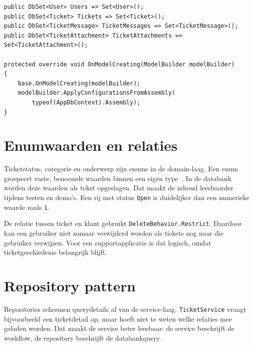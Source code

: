 \begin{listing}[htbp]
\begin{verbatim}
public DbSet<User> Users => Set<User>();
public DbSet<Ticket> Tickets => Set<Ticket>();
public DbSet<TicketMessage> TicketMessages => Set<TicketMessage>();
public DbSet<TicketAttachment> TicketAttachments => Set<TicketAttachment>();

protected override void OnModelCreating(ModelBuilder modelBuilder)
{
    base.OnModelCreating(modelBuilder);
    modelBuilder.ApplyConfigurationsFromAssembly(
        typeof(AppDbContext).Assembly);
}
\end{verbatim}
\caption[DbContext met configuraties]{\texttt{AppDbContext} laadt configuraties uit de persistence-laag.}
\label{lst:appdbcontext}
\end{listing}

\section{Enumwaarden en relaties}

Ticketstatus, categorie en onderwerp zijn enums in de domain-laag. Een enum groepeert vaste, benoemde waarden binnen een eigen type~\autocite{MicrosoftCSharpEnums2026}. In de databank worden deze waarden als tekst opgeslagen. Dat maakt de inhoud leesbaarder tijdens testen en demo's. Een rij met status \texttt{Open} is duidelijker dan een numerieke waarde zoals \texttt{1}.

De relatie tussen ticket en klant gebruikt \texttt{DeleteBehavior.Restrict}. Daardoor kan een gebruiker niet zomaar verwijderd worden als tickets nog naar die gebruiker verwijzen. Voor een supportapplicatie is dat logisch, omdat ticketgeschiedenis belangrijk blijft.

\section{Repository pattern}

Repositories schermen querydetails af van de service-laag. \texttt{TicketService} vraagt bijvoorbeeld een ticketdetail op, maar hoeft niet te weten welke relaties mee geladen worden. Dat maakt de service beter leesbaar: de service beschrijft de workflow, de repository beschrijft de databankquery.
